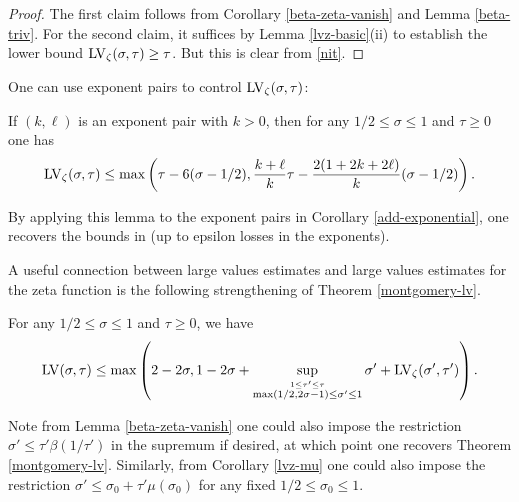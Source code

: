 \begin{proof}  The first claim follows from Corollary \ref{beta-zeta-vanish} and Lemma \ref{beta-triv}.  For the second claim, it suffices by Lemma \ref{lvz-basic}(ii) to establish the lower bound $\mathrm{LV}_\zeta(\sigma,\tau) \geq \tau$.  But this is clear from \eqref{nit}.
\end{proof}


One can use exponent pairs to control $\mathrm{LV}_\zeta(\sigma,\tau)$:

\begin{lemma}\label{zeta-from-exp}\cite[Theorem 8.2]{ivic} If $(k,\ell)$ is an exponent pair with $k>0$, then for any $1/2 \leq \sigma \leq 1$ and $\tau \geq 0$ one has
    $$ \mathrm{LV}_\zeta(\sigma,\tau) \leq \max\left( \tau - 6(\sigma-1/2), \frac{k+\ell}{k} \tau - \frac{2(1+2k+2\ell)}{k} (\sigma-1/2) \right).$$
\end{lemma}

By applying this lemma to the exponent pairs in Corollary \ref{add-exponential}, one recovers the bounds in \cite[Corollary 8.1, 8.2]{ivic} (up to epsilon losses in the exponents).

A useful connection between large values estimates and large values estimates for the zeta function is the following strengthening of Theorem \ref{montgomery-lv}.

\begin{lemma}\label{hl-improv}  For any $1/2 \leq \sigma \leq 1$ and $\tau \geq 0$, we have
    $$ \mathrm{LV}(\sigma,\tau) \leq \max\left(2-2\sigma, 1 - 2\sigma + \sup_{\stackrel{1 \leq \tau' \leq \tau}{\max(1/2,2\sigma-1) \leq \sigma' \leq 1}}  \sigma' + \mathrm{LV}_\zeta(\sigma',\tau') \right).$$
\end{lemma}

Note from Lemma \ref{beta-zeta-vanish} one could also impose the restriction $\sigma' \leq \tau' \beta(1/\tau')$ in the supremum if desired, at which point one recovers Theorem \ref{montgomery-lv}.  Similarly, from Corollary \ref{lvz-mu} one could also impose the restriction $\sigma' \leq \sigma_0 + \tau' \mu(\sigma_0)$ for any fixed $1/2 \leq \sigma_0 \leq 1$.

